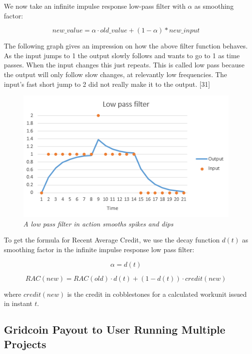 We now take an infinite impulse response low-pass filter with $\alpha$ as smoothing factor:

\begin{equation}
new\_value = \alpha \cdot old\_value + (1-\alpha) * new\_input
\end{equation}

The following graph gives an impression on how the above filter function behaves. As the input jumps to 1 the output slowly follows and wants to go to 1 as time passes. When the input changes this just repeats. This is called low pass because the output will only follow slow changes, at relevantly low frequencies. The input’s fast short jump to 2 did not really make it to the output. [31]\\

\begin{figure}
\centering
\includegraphics{figures/low-pass}
\caption{\textit{A low pass filter in action smooths spikes and dips}}
\small
\end{figure}


To get the formula for Recent Average Credit, we use the decay function $d(t)$ as smoothing factor in the infinite impulse response low pass filter:

\begin{equation}
\alpha=d(t)
\end{equation}

\begin{equation}
RAC(new) = RAC(old) \cdot d(t) + (1-d(t)) \cdot credit(new)
\end{equation}

where $credit(new)$ is the credit in cobblestones for a calculated workunit issued in instant $t$.

\subsection{Gridcoin Payout to User Running Multiple Projects}

